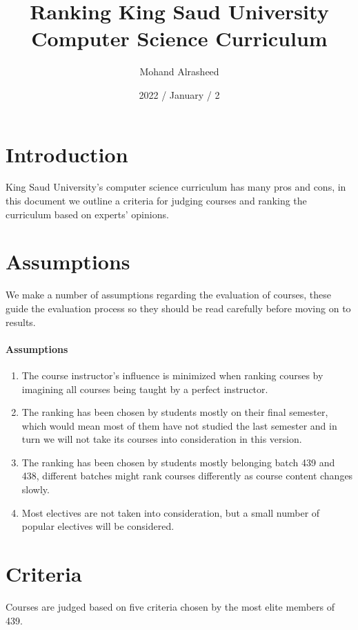 \documentclass[12pt,a4paper]{article}
\title{Ranking King Saud University Computer Science Curriculum}
\author{Mohand Alrasheed}
\date{2022 / January / 2}
\begin{document}
\maketitle
\clearpage

\tableofcontents
\clearpage


\section{Introduction}
King Saud University's computer science curriculum has many pros and cons, in this document we outline a criteria for judging courses and ranking the curriculum based on experts' opinions.

\section{Assumptions} 
We make a number of assumptions regarding the evaluation of courses, these guide the evaluation process so they should be read carefully before moving on to results.

\paragraph{Assumptions}
\begin{enumerate}
    \item The course instructor's influence is minimized when ranking courses by imagining all courses being taught by a perfect instructor.
    \item The ranking has been chosen by students mostly on their final semester, which would mean most of them have not studied the last semester and in turn we will not take its courses into consideration in this version.
    \item The ranking has been chosen by students mostly belonging batch 439 and 438, different batches might rank courses differently as course content changes slowly.
    \item Most electives are not taken into consideration, but a small number of popular electives will be considered. 
\end{enumerate}

\section{Criteria}
Courses are judged based on five criteria chosen by the most elite members of 439.
\end{document}
